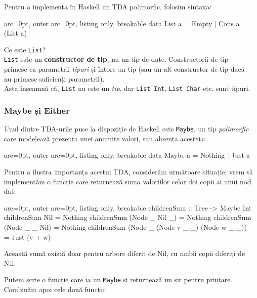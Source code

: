 Pentru a implementa în Haskell un TDA polimorfic, folosim sintaxa:


\begin{tcblisting}{ arc=0pt, outer arc=0pt, listing only, breakable}
data List a = Empty | Cons a (List a)

\end{tcblisting}


\begin{tcolorbox}[colback=blue!10, colframe=blue!20]
Ce este \texttt{List}?\\
\texttt{List} este un \textbf{constructor de tip}, nu un tip de date. Constructorii de tip primesc ca parametrii \textit{tipuri} și întorc un tip (sau un alt constructor de tip dacă nu primesc suficienți parametrii).\\Asta înseamnă că, \texttt{List} nu este un \textit{tip}, dar \texttt{List Int}, \texttt{List Char} etc. sunt tipuri.
\end{tcolorbox}

\subsubsection*{ Maybe și Either }

Unul dintre TDA-urile puse la dispoziție de Haskell este \texttt{Maybe}, un tip \textit{polimorfic} care modelează prezența unei anumite valori, sau absența acesteia:

\begin{tcblisting}{ arc=0pt, outer arc=0pt, listing only, breakable}
data Maybe a = Nothing | Just a

\end{tcblisting}


Pentru a ilustra importanța acestui TDA, considerăm următoare situație: vrem să implementăm o funcție care returnează suma valoriilor celor doi copii ai unui nod dat:


\begin{tcblisting}{ arc=0pt, outer arc=0pt, listing only, breakable}
childrenSum :: Tree -> Maybe Int
childrenSum Nil = Nothing
childrenSum (Node _ Nil _) = Nothing
childrenSum (Node _ _ Nil) = Nothing
childrenSum (Node _ (Node v _ _) (Node w _ _)) = Just (v + w)

\end{tcblisting}


Această sumă există doar pentru arbore diferit de Nil, cu ambii copii diferiți de Nil.

Putem scrie o funcție care ia un \texttt{Maybe} și returnează un șir pentru printare. Combinăm apoi cele două funcții:


